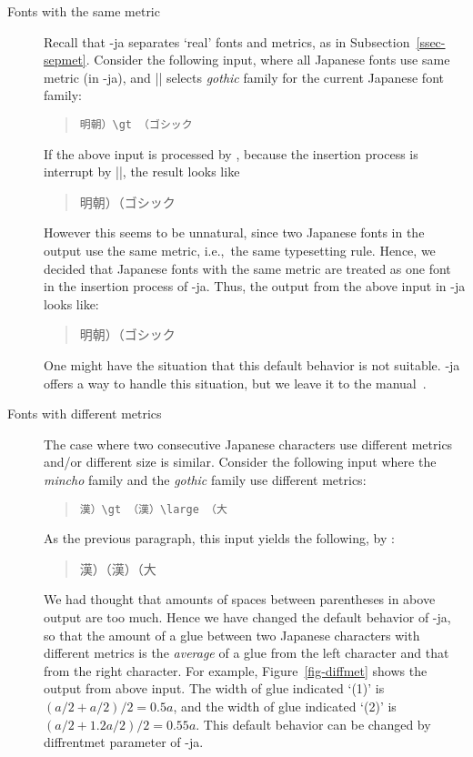 \documentclass{ajt}
\begin{document}
\begin{description}
\item[Fonts with the same metric]
Recall that \LuaTeX-ja separates `real' fonts and metrics, as in Subsection~\ref{ssec-sepmet}. 
Consider the following input, where all Japanese fonts use same metric
	   (in \LuaTeX-ja), and |\gt| selects \emph{gothic} family for
	   the current Japanese font family:
\begin{quote}
\begin{verbatim}
明朝）\gt （ゴシック
\end{verbatim}
\end{quote}
If the above input is processed by \pTeX, because the insertion process is
	   interrupt by |\gt|, the result looks like
\begin{quote}
\mc 明朝）\hbox{}\gt （ゴシック
\end{quote}
However this seems to be unnatural, since two Japanese fonts in the
	   output use the same metric, i.e.,~the same
	   typesetting rule.  Hence, we decided that Japanese fonts with
	   the same metric are treated as one font in the insertion
	   process of \LuaTeX-ja. Thus, the output from the above input
	   in \LuaTeX-ja looks like:
\begin{quote}
\mc 明朝）\gt （ゴシック
\end{quote}
One might have the situation that this default behavior is not
	   suitable. \LuaTeX-ja offers a way to handle this situation, but
	   we leave it to the manual~\cite{man}.

\item[Fonts with different metrics] 
The case where two consecutive Japanese characters use different metrics and/or
	   different size is similar. Consider the following input where
	   the \emph{mincho} family and the \emph{gothic} family use
	   different metrics:
\begin{quote}
\begin{verbatim}
漢）\gt （漢）\large （大
\end{verbatim}
\end{quote}
As the previous paragraph, this input yields the following, by \pTeX:
\begin{quote}
\mc 漢）\hbox{}\gt （漢）\hbox{}\large （大
\end{quote}
We had thought that amounts of spaces between parentheses in above output
	   are too much. Hence we have changed the default behavior of
	   \LuaTeX-ja, so that the amount of a glue between two Japanese
	   characters with different metrics is the \emph{average} of a glue
	   from the left character and that from the right
	   character. For example, Figure~\ref{fig-diffmet} shows the
	   output from above input. The width of glue indicated `(1)' is
	   $(a/2 + a/2)/2 = 0.5a$, and the width of glue indicated `(2)'
	   is $(a/2 + 1.2a/2)/2 = 0.55a$. This default behavior can be
	   changed by \textsf{diffrentmet} parameter of \LuaTeX-ja.


\end{description}
\end{document}

